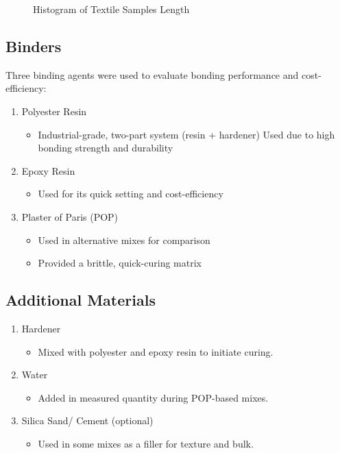 \begin{figure}[H]
    \centering
    \caption{Histogram of Textile Samples Length }
\end{figure}

\subsection{Binders}
Three binding agents were used to evaluate bonding performance and cost-efficiency: 
\begin{enumerate}
    \item Polyester Resin
    \begin{itemize}
        \item Industrial-grade, two-part system (resin + hardener) Used due to high bonding strength and durability
    \end{itemize}
    \item Epoxy Resin
    \begin{itemize}
        \item Used for its quick setting and cost-efficiency
    \end{itemize}
    \item Plaster of Paris (POP)
    \begin{itemize}
        \item Used in alternative mixes for comparison 
        \item Provided a brittle, quick-curing matrix 
    \end{itemize}
\end{enumerate}

\subsection{Additional Materials}
\begin{enumerate}
    \item Hardener
    \begin{itemize}
        \item Mixed with polyester and epoxy resin to initiate curing. 
    \end{itemize}
    \item Water
    \begin{itemize}
        \item Added in measured quantity during POP-based mixes. 
    \end{itemize}
    \item  Silica Sand/ Cement (optional)
    \begin{itemize}
        \item Used in some mixes as a filler for texture and bulk. 
    \end{itemize}
\end{enumerate}

